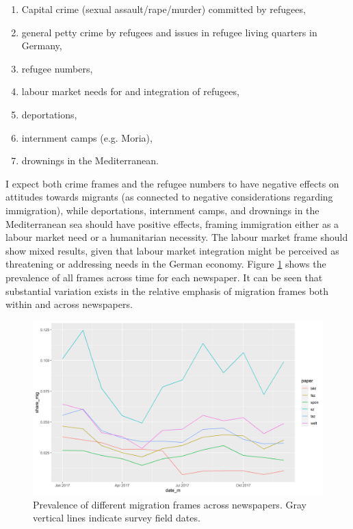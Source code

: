 \documentclass{article}
\begin{document}
\begin{enumerate}
    \item Capital crime (sexual assault/rape/murder) committed by refugees, 
    \item general petty crime by refugees and issues in refugee living quarters in Germany,
    \item refugee numbers,
    \item labour market needs for and integration of refugees,
    \item deportations,
    \item internment camps (e.g. Moria),
    \item drownings in the Mediterranean.
\end{enumerate}

I expect both crime frames and the refugee numbers to have negative effects on attitudes towards migrants (as connected to negative considerations regarding immigration), while deportations, internment camps, and drownings in the Mediterranean sea should have positive effects, framing immigration either as a labour market need or a humanitarian necessity. The labour market frame should show mixed results, given that labour market integration might be perceived as threatening or addressing needs in the German economy. Figure \ref{fig:frames} shows the prevalence of all frames across time for each newspaper. It can be seen that substantial variation exists in the relative emphasis of migration frames both within and across newspapers.

\begin{figure}[!ht]
    \centering
    \includegraphics[width=\textwidth]{paper/vis/frames_papers_focus.png}
    \caption{Prevalence of different migration frames across newspapers. Gray vertical lines indicate survey field dates.}
    \label{fig:frames}
\end{figure}
\end{document}
